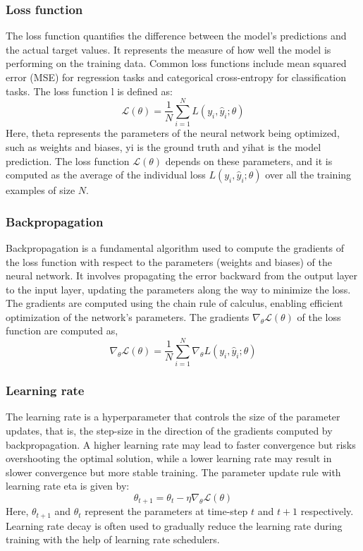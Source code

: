 \subsubsection{Loss function}
The loss function quantifies the difference between the model's predictions and the actual target values. It represents the measure of how well the model is performing on the training data. Common loss functions include mean squared error (MSE) for regression tasks and categorical cross-entropy for classification tasks. The loss function \gls{l} is defined as: 
\begin{equation}
    \mathcal{L}(\theta)=\frac{1}{N} \sum_{i=1}^N L\left(y_i, \hat{y}_i ; \theta\right)
    \end{equation}
Here, \gls{theta} represents the parameters of the neural network being optimized, such as weights and biases, \gls{yi} is the ground truth and \gls{yihat} is the model prediction. The loss function $\mathcal{L}(\theta)$ depends on these parameters, and it is computed as the average of the individual loss $L\left(y_i, \hat{y}_i ; \theta\right)$ over all the training examples of size $N$.
\subsubsection{Backpropagation}
Backpropagation is a fundamental algorithm used to compute the gradients of the loss function with respect to the parameters (weights and biases) of the neural network. It involves propagating the error backward from the output layer to the input layer, updating the parameters along the way to minimize the loss. The gradients are computed using the chain rule of calculus, enabling efficient optimization of the network's parameters. The gradients $\nabla_\theta \mathcal{L}(\theta)$ of the loss function are computed as,
\begin{equation}
    \nabla_\theta \mathcal{L}(\theta)=\frac{1}{N} \sum_{i=1}^N \nabla_\theta L\left(y_i, \hat{y}_i ; \theta\right)
    \end{equation}
\subsubsection{Learning rate}
The learning rate is a hyperparameter that controls the size of the parameter updates, that is, the step-size in the direction of the gradients computed by backpropagation. A higher learning rate may lead to faster convergence but risks overshooting the optimal solution, while a lower learning rate may result in slower convergence but more stable training. The parameter update rule with learning rate \gls{eta} is given by:
\begin{equation}
    \theta_{t+1}=\theta_t-\eta \nabla_\theta \mathcal{L}(\theta)
    \end{equation}
Here, $\theta_{t+1}$ and $\theta_t$ represent the parameters at time-step $t$ and $t+1$ respectively. Learning rate decay is often used to gradually reduce the learning rate during training with the help of learning rate schedulers.

